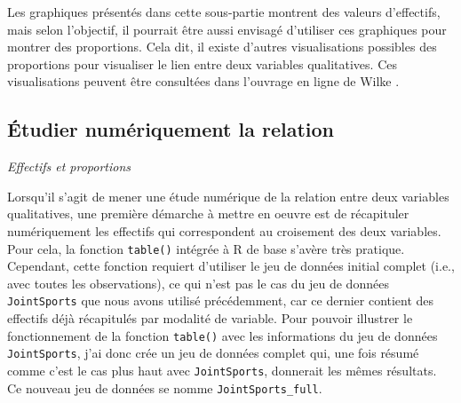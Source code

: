 \documentclass[
]{book}
\begin{document}
Les graphiques présentés dans cette sous-partie montrent des valeurs d'effectifs, mais selon l'objectif, il pourrait être aussi envisagé d'utiliser ces graphiques pour montrer des proportions. Cela dit, il existe d'autres visualisations possibles des proportions pour visualiser le lien entre deux variables qualitatives. Ces visualisations peuvent être consultées dans l'ouvrage en ligne de Wilke \autocite*{wilkeFundamentalsDataVisualization2018}.

\hypertarget{uxe9tudier-numuxe9riquement-la-relation-1}{%
\subsection{Étudier numériquement la relation}\label{uxe9tudier-numuxe9riquement-la-relation-1}}

\emph{Effectifs et proportions}

Lorsqu'il s'agit de mener une étude numérique de la relation entre deux variables qualitatives, une première démarche à mettre en oeuvre est de récapituler numériquement les effectifs qui correspondent au croisement des deux variables. Pour cela, la fonction \texttt{table()} intégrée à R de base s'avère très pratique. Cependant, cette fonction requiert d'utiliser le jeu de données initial complet (i.e., avec toutes les observations), ce qui n'est pas le cas du jeu de données \texttt{JointSports} que nous avons utilisé précédemment, car ce dernier contient des effectifs déjà récapitulés par modalité de variable. Pour pouvoir illustrer le fonctionnement de la fonction \texttt{table()} avec les informations du jeu de données \texttt{JointSports}, j'ai donc crée un jeu de données complet qui, une fois résumé comme c'est le cas plus haut avec \texttt{JointSports}, donnerait les mêmes résultats. Ce nouveau jeu de données se nomme \texttt{JointSports\_full}.
\end{document}
